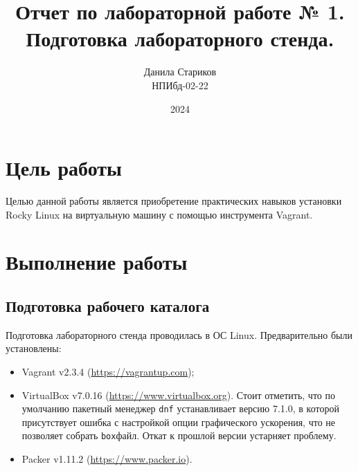 

\title{Отчет по лабораторной работе № 1. \\ Подготовка лабораторного стенда.}
\author{Данила Стариков \\ НПИбд-02-22}
\date{2024}



\maketitle
\newpage

\tableofcontents

\newpage
\section{Цель работы}

Целью данной работы является приобретение практических навыков установки Rocky Linux на виртуальную машину с помощью инструмента Vagrant.

\newpage
\section{Выполнение работы}
\subsection{Подготовка рабочего каталога}

Подготовка лабораторного стенда проводилась в ОС Linux. Предварительно были установлены:
\begin{itemize}
    \item Vagrant v2.3.4 (\url{https://vagrantup.com});
    \item VirtualBox v7.0.16 (\url{https://www.virtualbox.org}). Стоит отметить, что по умолчанию пакетный менеджер \texttt{dnf} устанавливает версию 7.1.0, в которой присутствует ошибка с настройкой опции графического ускорения, что не позволяет собрать \texttt{box}\-файл. Откат к прошлой версии устарняет проблему.
    \item Packer v1.11.2 (\url{https://www.packer.io}).
\end{itemize}


